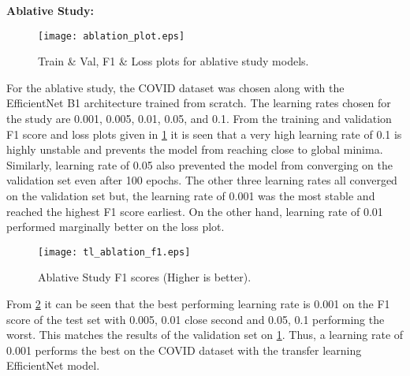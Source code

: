 \documentclass[10pt,twocolumn,letterpaper]{article}
\begin{document}
\textbf{Ablative Study:}
\begin{figure}[t]
  \centering
  \texttt{[image: ablation\_plot.eps]}  
   \caption{Train \& Val, F1 \& Loss plots for ablative study models.}
   \label{fig:ablation_plot}
\end{figure}
For the ablative study, the COVID dataset was chosen along with the EfficientNet B1 architecture 
trained from scratch. The learning rates chosen for the study are 0.001, 0.005, 0.01, 0.05, and 0.1.
From the training and validation F1 score and loss plots given in 
\cref{fig:ablation_plot} it is seen that a very high learning rate of 0.1 is highly unstable and 
prevents the model from reaching close to global minima. Similarly, learning rate of 0.05 also prevented 
the model from converging on the validation set even after 100 epochs. The other three learning 
rates all converged on the validation set but, the learning rate of 0.001 was the most stable 
and reached the highest F1 score earliest. On the other hand, learning rate of 0.01 performed marginally 
better on the loss plot.
\begin{figure}[t]
  \centering
  \texttt{[image: tl\_ablation\_f1.eps]}  
   \caption{Ablative Study F1 scores (Higher is better).}
   \label{fig:ablation}
\end{figure}
From \cref{fig:ablation} it can be seen that the best performing learning rate is 0.001 
on the F1 score of the test set with 0.005, 0.01 close second and 0.05, 0.1 performing the worst.
This matches the results of the validation set on \cref{fig:ablation_plot}. Thus, a learning rate of 
0.001 performs the best on the COVID dataset with the transfer learning EfficientNet model.


\clearpage
{\small


}
\end{document}
